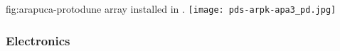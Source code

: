 
\begin{dunefigure}{fig:arapuca-protodune}
{ array installed in .} 
\texttt{[image: pds-arpk-apa3\_pd.jpg]} 
\end{dunefigure}


\subsubsection{ Electronics}
\label{sec:ssp-protodune-electronics}





